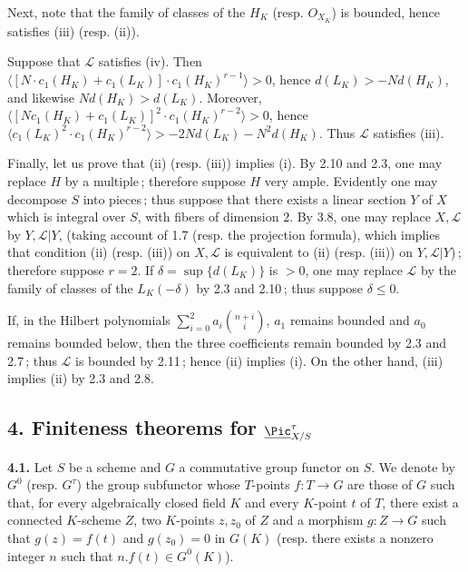 Next, note that the family of classes of the \(H_K\) (resp. \({O}_{X_K}\)) is bounded, hence satisfies (iii) (resp. (ii)).

Suppose that \(\mathcal L\) satisfies (iv). Then \(\langle [N\cdot c_1(H_K)+c_1(L_K)]\cdot c_1(H_K)^{r-1}\rangle>0\), hence \(d(L_K)>-Nd(H_K)\), and likewise \(Nd(H_K)>d(L_K)\). Moreover, \(\langle [N c_1(H_K)+c_1(L_K)]^2\cdot c_1(H_K)^{r-2}\rangle>0\), hence \(\langle c_1(L_K)^2\cdot c_1(H_K)^{r-2}\rangle>-2Nd(L_K)-N^2d(H_K)\). Thus \(\mathcal L\) satisfies (iii).

Finally, let us prove that (ii) (resp. (iii)) implies (i). By 2.10 and 2.3, one may replace \(H\) by a multiple\,; therefore suppose \(H\) very ample. Evidently one may decompose \(S\) into pieces\,; thus suppose that there exists a linear section \(Y\) of \(X\) which is integral over \(S\), with fibers of dimension \(2\). By 3.8, one may replace \(X,\mathcal L\) by \(Y,\mathcal L|Y\), (taking account of 1.7 (resp. the projection formula), which implies that condition (ii) (resp. (iii)) on \(X,\mathcal L\) is equivalent to (ii) (resp. (iii)) on \(Y,\mathcal L|Y\))\,; therefore suppose \(r=2\). If \(\delta=\sup\{d(L_K)\}\) is \(>0\), one may replace \(\mathcal L\) by the family of classes of the \(L_K(-\delta)\) by 2.3 and 2.10\,; thus suppose \(\delta\le0\).

If, in the Hilbert polynomials \(\sum_{i=0}^{2}a_i\binom{n+i}{i}\), \(a_1\) remains bounded and \(a_0\) remains bounded below, then the three coefficients remain bounded by 2.3 and 2.7\,; thus \(\mathcal L\) is bounded by 2.11\,; hence (ii) implies
%
(i). On the other hand, (iii) implies (ii) by 2.3 and 2.8.

\subsection*{4. Finiteness theorems for $\underline{\Pic}^\tau_{X/S}$}

\textbf{4.1.} Let \(S\) be a scheme and \(G\) a commutative group functor on \(S\). We denote by \(G^0\) (resp. \(G^\tau\)) the group subfunctor whose \(T\)-points \(f:T\to G\) are those of \(G\) such that, for every algebraically closed field \(K\) and every \(K\)-point \(t\) of \(T\), there exist a connected \(K\)-scheme \(Z\), two \(K\)-points \(z,z_0\) of \(Z\) and a morphism \(g:Z\to G\) such that \(g(z)=f(t)\) and \(g(z_0)=0\) in \(G(K)\) (resp. there exists a nonzero integer \(n\) such that \(n.f(t)\in G^0(K)\)).

